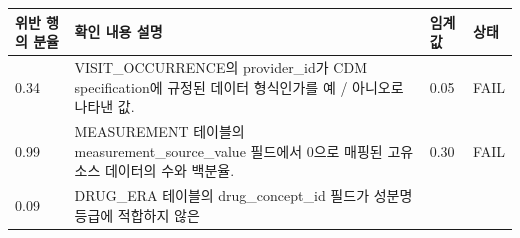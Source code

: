 \documentclass[10.5pt]{book}
\theoremstyle{definition}
\theoremstyle{definition}
\theoremstyle{definition}
\theoremstyle{remark}
\begin{document}
\begin{longtable}[]{@{}llll@{}}
\toprule
\begin{minipage}[b]{0.12\columnwidth}\raggedright\strut
위반 행의 분율\strut
\end{minipage} & \begin{minipage}[b]{0.47\columnwidth}\raggedright\strut
확인 내용 설명\strut
\end{minipage} & \begin{minipage}[b]{0.10\columnwidth}\raggedright\strut
임계값\strut
\end{minipage} & \begin{minipage}[b]{0.07\columnwidth}\raggedright\strut
상태\strut
\end{minipage}\tabularnewline
\midrule
\endhead
\begin{minipage}[t]{0.12\columnwidth}\raggedright\strut
0.34\strut
\end{minipage} & \begin{minipage}[t]{0.47\columnwidth}\raggedright\strut
VISIT\_OCCURRENCE의 provider\_id가 CDM specification에 규정된 데이터
형식인가를 예 / 아니오로 나타낸 값.\strut
\end{minipage} & \begin{minipage}[t]{0.10\columnwidth}\raggedright\strut
0.05\strut
\end{minipage} & \begin{minipage}[t]{0.07\columnwidth}\raggedright\strut
FAIL\strut
\end{minipage}\tabularnewline
\begin{minipage}[t]{0.12\columnwidth}\raggedright\strut
0.99\strut
\end{minipage} & \begin{minipage}[t]{0.47\columnwidth}\raggedright\strut
MEASUREMENT 테이블의 measurement\_source\_value 필드에서 0으로 매핑된
고유 소스 데이터의 수와 백분율.\strut
\end{minipage} & \begin{minipage}[t]{0.10\columnwidth}\raggedright\strut
0.30\strut
\end{minipage} & \begin{minipage}[t]{0.07\columnwidth}\raggedright\strut
FAIL\strut
\end{minipage}\tabularnewline
\begin{minipage}[t]{0.12\columnwidth}\raggedright\strut
0.09\strut
\end{minipage} & \begin{minipage}[t]{0.47\columnwidth}\raggedright\strut
DRUG\_ERA 테이블의 drug\_concept\_id 필드가 성분명 등급에 적합하지 않은

\end{minipage}
\end{longtable}
\end{document}

